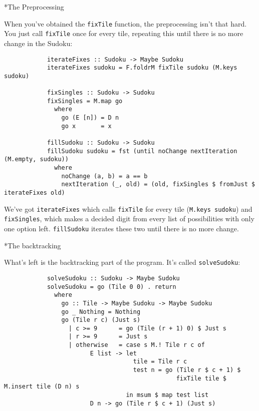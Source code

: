 \documentclass[a4paper,12pt]{article}
\begin{document}
\begin{section}
\begin{subsection}
        \begin{subsubsection}*{The Preprocessing}

            When you've obtained the \texttt{fixTile} function, the
            preprocessing isn't that hard. You just call \texttt{fixTile} once
            for every tile, repeating this until there is no more change in the
            Sudoku:
            \begin{lstlisting}
            iterateFixes :: Sudoku -> Maybe Sudoku
            iterateFixes sudoku = F.foldrM fixTile sudoku (M.keys sudoku)

            fixSingles :: Sudoku -> Sudoku
            fixSingles = M.map go
              where
                go (E [n]) = D n
                go x       = x

            fillSudoku :: Sudoku -> Sudoku
            fillSudoku sudoku = fst (until noChange nextIteration (M.empty, sudoku))
              where
                noChange (a, b) = a == b
                nextIteration (_, old) = (old, fixSingles $ fromJust $ iterateFixes old)
            \end{lstlisting}

            We've got \texttt{iterateFixes} which calls \texttt{fixTile} for
            every tile (\texttt{M.keys sudoku}) and \texttt{fixSingles}, which
            makes a decided digit from every list of possibilities with only one
            option left. \texttt{fillSudoku} iterates these two until there is
            no more change.

        \end{subsubsection}


        \begin{subsubsection}*{The backtracking}

            What's left is the backtracking part of the program. It's called
            \texttt{solveSudoku}:
            \begin{lstlisting}
            solveSudoku :: Sudoku -> Maybe Sudoku
            solveSudoku = go (Tile 0 0) . return
              where
                go :: Tile -> Maybe Sudoku -> Maybe Sudoku
                go _ Nothing = Nothing
                go (Tile r c) (Just s)
                  | c >= 9      = go (Tile (r + 1) 0) $ Just s
                  | r >= 9      = Just s
                  | otherwise   = case s M.! Tile r c of
                        E list -> let
                                    tile = Tile r c
                                    test n = go (Tile r $ c + 1) $
                                                fixTile tile $ M.insert tile (D n) s
                                  in msum $ map test list
                        D n -> go (Tile r $ c + 1) (Just s)
            \end{lstlisting}


\end{subsubsection}
\end{subsection}
\end{section}
\end{document}
